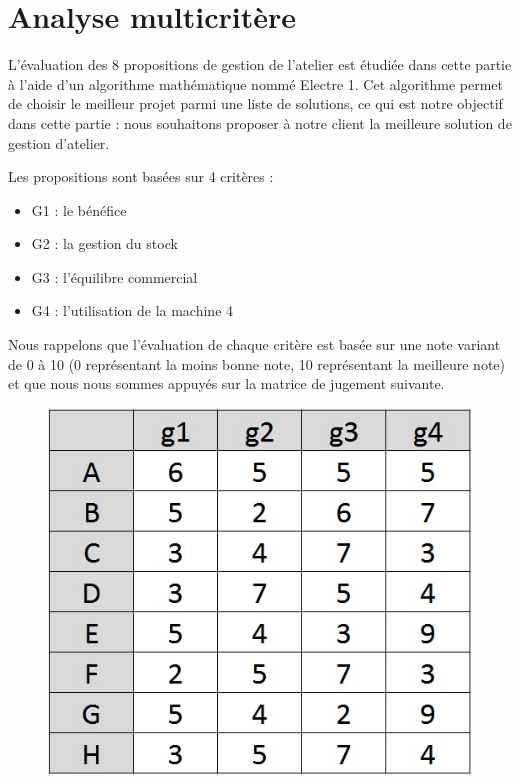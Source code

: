 \documentclass[a4paper,10pt]{article}
\begin{document}
\part{Analyse multicritère}

L'évaluation des 8 propositions de gestion de l'atelier est étudiée dans cette partie à l'aide d'un algorithme mathématique nommé Electre 1. Cet algorithme permet de choisir le meilleur projet parmi une liste de solutions, ce qui est notre objectif dans cette partie : nous souhaitons proposer à notre client la meilleure solution de gestion d'atelier.

Les propositions sont basées sur 4 critères  :
\begin{itemize}
\item G1 : le bénéfice
\item G2 : la gestion du stock
\item G3 : l'équilibre commercial
\item G4 : l'utilisation de la machine 4
\end{itemize}

Nous rappelons que l'évaluation de chaque critère est basée sur une note variant de 0 à 10 (0 représentant la moins bonne note, 10 représentant la meilleure note) et que nous nous sommes appuyés sur la matrice de jugement suivante.

\begin{figure}[h]
\begin{center}
\includegraphics[scale=0.3]{img/AD-Jugement.jpg}
\end{center}
\end{figure}
\end{document}
